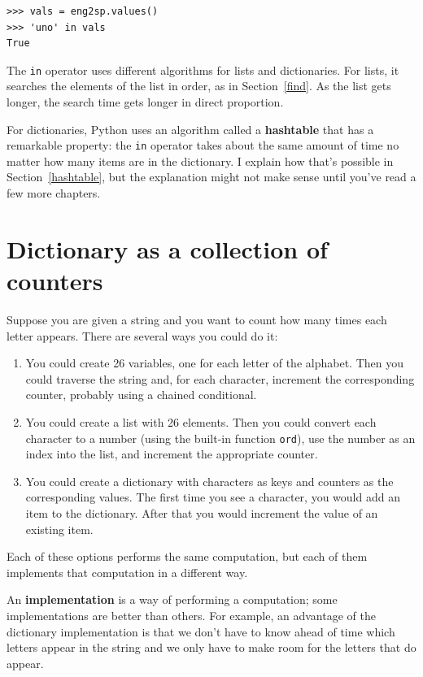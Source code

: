 \documentclass[10pt]{book}
\begin{document}
\begin{verbatim}
>>> vals = eng2sp.values()
>>> 'uno' in vals
True
\end{verbatim}
%
The {\tt in} operator uses different algorithms for lists and
dictionaries.  For lists, it searches the elements of the list in
order, as in Section~\ref{find}.  As the list gets longer, the search
time gets longer in direct proportion.

For dictionaries, Python uses an
algorithm called a {\bf hashtable} that has a remarkable property: the
{\tt in} operator takes about the same amount of time no matter how
many items are in the dictionary.  I explain how that's possible
in Section~\ref{hashtable}, but the explanation might not make
sense until you've read a few more chapters.


\section{Dictionary as a collection of counters}
\label{histogram}

Suppose you are given a string and you want to count how many
times each letter appears.  There are several ways you could do it:

\begin{enumerate}

\item You could create 26 variables, one for each letter of the
alphabet.  Then you could traverse the string and, for each
character, increment the corresponding counter, probably using
a chained conditional.

\item You could create a list with 26 elements.  Then you could
convert each character to a number (using the built-in function
{\tt ord}), use the number as an index into the list, and increment
the appropriate counter.

\item You could create a dictionary with characters as keys
and counters as the corresponding values.  The first time you
see a character, you would add an item to the dictionary.  After
that you would increment the value of an existing item.

\end{enumerate}

Each of these options performs the same computation, but each
of them implements that computation in a different way.

An {\bf implementation} is a way of performing a computation;
some implementations are better than others.  For example,
an advantage of the dictionary implementation is that we don't
have to know ahead of time which letters appear in the string
and we only have to make room for the letters that do appear.
\end{document}
